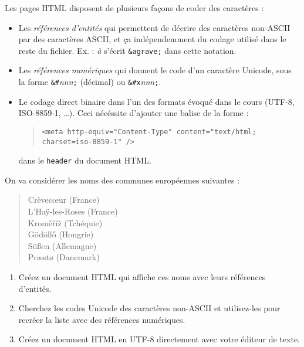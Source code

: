 \documentclass[11pt]{article}
\begin{document}
Les pages HTML disposent de plusieurs façons de coder des caractères :\\

\begin{itemize}
 \item Les \emph{références d'entités} qui permettent de décrire
des caractères non-ASCII par des caractères ASCII, et ça indépendemment du
codage utilisé dans le reste du fichier. Ex. : \emph{à} s'écrit
\texttt{\&agrave;} dans cette notation.\smallskip
 \item Les \emph{références
numériques} qui donnent le code d'un caractère Unicode, sous la forme
\texttt{\&\#}\emph{nnn}\texttt{;} (décimal) ou
\texttt{\&\#x}\emph{nnn}\texttt{;}.\smallskip
 \item Le codage direct binaire
dans l'un des formats évoqué dans le cours (UTF-8, ISO-8859-1, \ldots). Ceci
nécéssite d'ajouter une balise de la forme :
 \begin{quote}
  \texttt{<meta http-equiv="Content-Type" content="text/html; charset=iso-8859-1" />}
 \end{quote}
dans le \texttt{header} du document HTML.\\
\end{itemize}

On va considérer les noms des communes européennes suivantes :
 \begin{quote}
 Crèvec\oe{}ur (France)\\ L'Ha\"y-les-Roses (France)\\ Krom\v{e}\v{r}\'i\v{z}
(Tchéquie)\\ G\"od\"oll\H{o} (Hongrie)\\ S\"u\ss{}en (Allemagne)\\
Pr\ae{}st\o{} (Danemark)
 \end{quote}

\begin{enumerate}
 \item Créez un document HTML qui affiche ces noms avec leurs
références d'entités.\smallskip
 \item Cherchez les codes Unicode des caractères
non-ASCII et utilisez-les pour recréer la liste avec des références
numériques.\smallskip
 \item Créez un document HTML en UTF-8 directement avec
votre éditeur de texte.
\end{enumerate}
\end{document}
